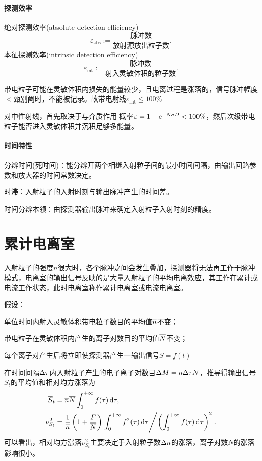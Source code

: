 \paragraph{探测效率}
绝对探测效率(absolute detection efficiency)
\[
	\varepsilon_{\mathrm{abs}}:=\frac{\text{脉冲数}}{\text{放射源放出粒子数}}.
\]
本征探测效率(intrinsic detection efficiency)
\[
	\varepsilon_{\mathrm{int}}:=\frac{\text{脉冲数}}{\text{射入灵敏体积的粒子数}}.
\]

带电粒子可能在灵敏体积内损失的能量较少，且电离过程是涨落的，信号脉冲幅度$<$甄别阈时，不能被记录。故带电射线$\varepsilon_{\mathrm{int}}\leqslant 100\%$

对中性射线，首先取决于与介质作用%
概率$\varepsilon=1-\mathop{}\!\mathrm{e}^{-N\sigma D}<100\%$，然后次级带电粒子能否进入灵敏体积并沉积足够多能量。
\paragraph{时间特性}
分辨时间(死时间)：能分辨开两个相继入射粒子间的最小时间间隔，由输出回路参数和放大器的时间常数决定。

时滞：入射粒子的入射时刻与输出脉冲产生的时间差。

时间分辨本领：由探测器输出脉冲来确定入射粒子入射时刻的精度。

\section{累计电离室}

入射粒子的强度$n$很大时，各个脉冲之间会发生叠加，探测器将无法再工作于脉冲模式，电离室的输出信号反映的是大量入射粒子的平均电离效应，其工作在累计或电流工作状态，此时电离室称作累计电离室或电流电离室。


假设：
\begin{compactenum}
	\item 单位时间内射入灵敏体积带电粒子数目的平均值$\overline{n}$不变；
	\item 带电粒子在灵敏体积内产生的离子对数目的平均值$\overline{N}$不变；
	\item 每个离子对产生后将立即使探测器产生一输出信号$S=f(t)$
\end{compactenum}
在时间间隔$\Delta\tau$内入射粒子产生的电子离子对数目$\Delta M=n\Delta\tau N$，推导得输出信号$S_t$的平均值和相对均方涨落为
\begin{align*}
	\overline{S}_t&=\overline{n}\overline{N}\int_0^{+\infty} f(\tau)\mathop{}\!\mathrm{d}\tau,\\
	\nu_{S_t}^2&=\frac1{\overline{n}}\left(1+\frac F{\overline{N}}\right)\left.{\int_0^{+\infty} f^2(\tau)\mathop{}\!\mathrm{d}\tau}\middle/{\left(\int_0^{+\infty} f(\tau)\mathop{}\!\mathrm{d}\tau\right)^2}\right..
\end{align*}
可以看出，相对均方涨落$\nu_{S_t}^2$主要决定于入射粒子数$\Delta n$的涨落，离子对数$N$的涨落影响很小。
